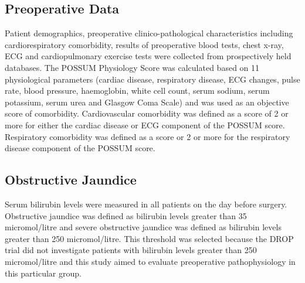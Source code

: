 \subsection{Preoperative Data}
Patient demographics, preoperative clinico-pathological characteristics including cardiorespiratory comorbidity, results of preoperative blood tests, chest x-ray, ECG and cardiopulmonary exercise tests were collected from prospectively held databases. 
The POSSUM Physiology Score was calculated based on 11 physiological parameters (cardiac disease, respiratory disease, ECG changes, pulse rate, blood pressure, haemoglobin, white cell count, serum sodium, serum potassium, serum urea and Glasgow Coma Scale) and was used as an objective score of comorbidity. 
Cardiovascular comorbidity was defined as a score of 2 or more for either the cardiac disease or ECG component of the POSSUM score. 
Respiratory comorbidity was defined as a score or 2 or more for the respiratory disease component of the POSSUM score. 

\subsection{Obstructive Jaundice}
Serum bilirubin levels were measured in all patients on the day before surgery. 
Obstructive jaundice was defined as bilirubin levels greater than 35 micromol/litre and severe obstructive jaundice was defined as bilirubin levels greater than 250 micromol/litre. 
This threshold was selected because the DROP trial did not investigate patients with bilirubin levels greater than 250 micromol/litre and this study aimed to evaluate preoperative pathophysiology in this particular group. 

